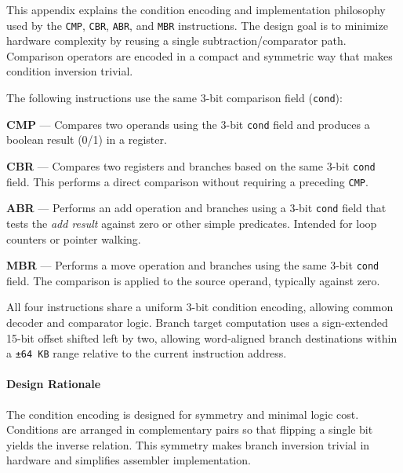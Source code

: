 
This appendix explains the condition encoding and implementation philosophy used by the \texttt{CMP}, \texttt{CBR}, \texttt{ABR}, and \texttt{MBR} instructions. The design goal is to minimize hardware complexity by reusing a single subtraction/comparator path. Comparison operators are encoded in a compact and symmetric way that makes condition inversion trivial.

The following instructions use the same 3-bit comparison field (\texttt{cond}):

\begin{smallGapItemize}
  \item \textbf{CMP} — Compares two operands using the 3-bit \texttt{cond} field and produces a boolean result (0/1) in a register.
  \item \textbf{CBR} — Compares two registers and branches based on the same 3-bit \texttt{cond} field. This performs a direct comparison without requiring a preceding \texttt{CMP}.
  \item \textbf{ABR} — Performs an add operation and branches using a 3-bit \texttt{cond} field that tests the \emph{add result} against zero or other simple predicates. Intended for loop counters or pointer walking.
  \item \textbf{MBR} — Performs a move operation and branches using the same 3-bit \texttt{cond} field. The comparison is applied to the source operand, typically against zero.
\end{smallGapItemize}

All four instructions share a uniform 3-bit condition encoding, allowing common decoder and comparator logic.  
Branch target computation uses a sign-extended 15-bit offset shifted left by two, allowing word-aligned branch destinations within a \texttt{±64\,KB} range relative to the current instruction address.

\paragraph{Design Rationale}

The condition encoding is designed for symmetry and minimal logic cost. Conditions are arranged in complementary pairs so that flipping a single bit yields the inverse relation. This symmetry makes branch inversion trivial in hardware and simplifies assembler implementation.

